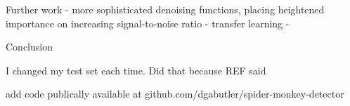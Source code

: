 \documentclass[11pt]{article}
\begin{document}
Further work
- more sophisticated denoising functions, placing heightened importance on increasing signal-to-noise ratio
- transfer learning
- 

Conclusion



I changed my test set each time. Did that because REF said

add code publically available at github.com/dgabutler/spider-monkey-detector



\end{document}
